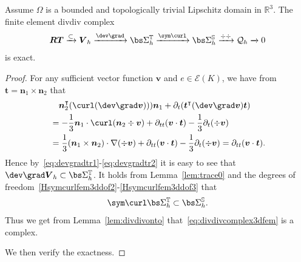 \begin{theorem}
Assume $\Omega$ is a bounded and topologically trivial Lipschitz domain in $\mathbb R^3$.
The finite element divdiv complex
\begin{equation}\label{eq:divdivcomplex3dfem}
\boldsymbol{RT}\xrightarrow{\subset} \boldsymbol V_h\xrightarrow{\dev\grad}\bs\Sigma_h^{\mathbb T}\xrightarrow{\sym\curl} \bs\Sigma_h^{\mathbb S} \xrightarrow{\div{\div}} \mathcal Q_h\xrightarrow{}0
\end{equation}
is exact.
\end{theorem}
\begin{proof}
For any sufficient vector function $\boldsymbol v$ and $e\in\mathcal E(K)$, we have from $\boldsymbol t=\boldsymbol n_1\times \boldsymbol n_2$ that
\begin{align*}
&\quad\boldsymbol n_{2}^{\intercal}(\curl(\dev\grad\boldsymbol v)))\boldsymbol n_1 + \partial_{t}(\boldsymbol t^{\intercal}(\dev\grad\boldsymbol v)\boldsymbol t) \\
&= -\frac{1}{3}\boldsymbol n_1\cdot\curl(\boldsymbol n_{2}\div\boldsymbol v) + \partial_{tt}(\boldsymbol v\cdot\boldsymbol t)- \frac{1}{3}\partial_{t}(\div\boldsymbol v) \\
&= \frac{1}{3}(\boldsymbol n_1\times\boldsymbol n_2)\cdot\nabla(\div\boldsymbol v)  + \partial_{tt}(\boldsymbol v\cdot\boldsymbol t)- \frac{1}{3}\partial_{t}(\div\boldsymbol v)=\partial_{tt}(\boldsymbol v\cdot\boldsymbol t).
\end{align*}
Hence by~\eqref{eq:devgradtr1}-\eqref{eq:devgradtr2} it is easy to see that $\dev\grad\boldsymbol V_h\subset\bs\Sigma_h^{\mathbb T}$.
It holds from Lemma~\ref{lem:trace0} and the degrees of freedom~\eqref{Hsymcurlfem3ddof2}-\eqref{Hsymcurlfem3ddof3} that
\begin{equation}\label{eq:symcurlinsigmaS}
\sym\curl\bs\Sigma_h^{\mathbb T}\subset\bs\Sigma_h^{\mathbb S}.
\end{equation}
Thus we get from Lemma~\ref{lem:divdivonto} that~\eqref{eq:divdivcomplex3dfem} is a complex.

We then verify the exactness.


\end{proof}
